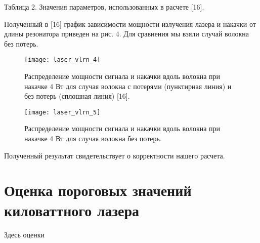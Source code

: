 Таблица 2. Значения параметров, использованных в расчете [16].

Полученный в [16] график зависимости мощности излучения лазера и накачки от длины резонатора приведен на рис. 4. Для сравнения мы взяли случай волокна без потерь.

\begin{figure}[ht]
  \centering
  \texttt{[image: laser\_vlrn\_4]}
  \caption{Распределение мощности сигнала и накачки вдоль волокна при накачке 4 Вт для случая волокна с потерями (пунктирная линия) и без потерь (сплошная линия) [16].}
  \label{img:laser_vlrn_4}
\end{figure}

\begin{figure}[ht]
  \centering
  \texttt{[image: laser\_vlrn\_5]}
  \caption{Распределение мощности сигнала и накачки вдоль волокна при накачке 4 Вт для случая волокна без потерь.}
  \label{img:laser_vlrn_5}
\end{figure}

Полученный результат свидетельствует о корректности нашего расчета.

\section{Оценка пороговых значений киловаттного лазера}

Здесь оценки

